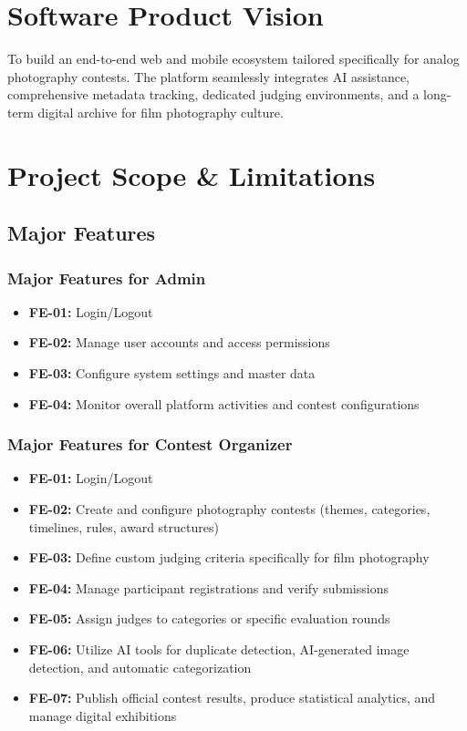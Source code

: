 \section{Software Product Vision}
To build an end-to-end web and mobile ecosystem tailored specifically for analog photography contests. The platform seamlessly integrates AI assistance, comprehensive metadata tracking, dedicated judging environments, and a long-term digital archive for film photography culture.

\section{Project Scope \& Limitations}
\subsection{Major Features}
\subsubsection{Major Features for Admin}
\begin{itemize}
    \item \textbf{FE-01:} Login/Logout
    \item \textbf{FE-02:} Manage user accounts and access permissions
    \item \textbf{FE-03:} Configure system settings and master data
    \item \textbf{FE-04:} Monitor overall platform activities and contest configurations
\end{itemize}

\subsubsection{Major Features for Contest Organizer}
\begin{itemize}
    \item \textbf{FE-01:} Login/Logout
    \item \textbf{FE-02:} Create and configure photography contests (themes, categories, timelines, rules, award structures)
    \item \textbf{FE-03:} Define custom judging criteria specifically for film photography
    \item \textbf{FE-04:} Manage participant registrations and verify submissions
    \item \textbf{FE-05:} Assign judges to categories or specific evaluation rounds
    \item \textbf{FE-06:} Utilize AI tools for duplicate detection, AI-generated image detection, and automatic categorization
    \item \textbf{FE-07:} Publish official contest results, produce statistical analytics, and manage digital exhibitions
\end{itemize}

